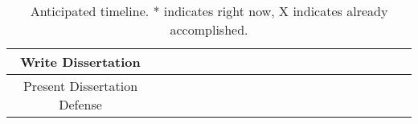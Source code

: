 \begin{table}[h]
{\begin{tabular}{| c | c | c | c | c | c | c | c | c | c | c | c | c | c | c | c | c | c | c | c | c |}
        \hline
           Write Dissertation & & & & & & & & & & & & & & & &{\cellcolor{lgray}}& {\cellcolor{lgray}}& {\cellcolor{lgray}} &  &\\
        \hline
           Present Dissertation Defense  &  &  &  &  &  &  &  &  &  &  &  &  &  &  &  &&  & {\cellcolor{lgray}} &  &\\
        \hline
    \end{tabular}}
    \caption{Anticipated timeline. * indicates right now, X indicates already accomplished.}
\end{table}

